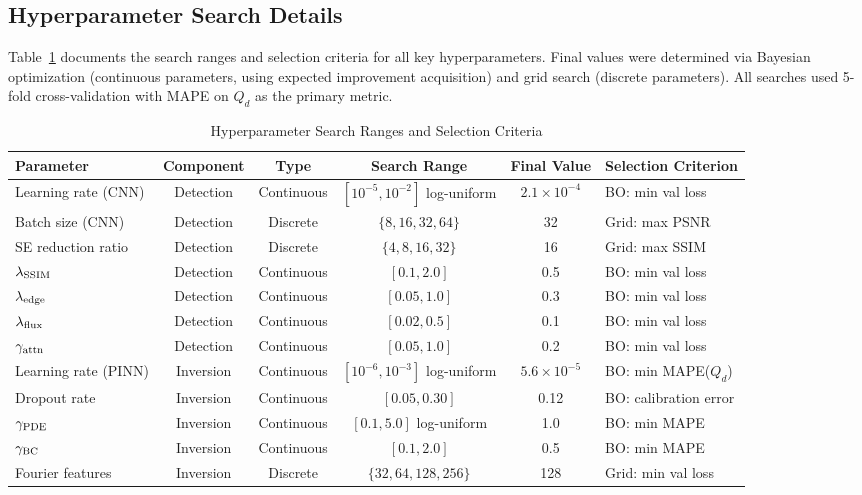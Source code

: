 \documentclass[usenatbib]{mnras}
\begin{document}
\subsection{Hyperparameter Search Details}\label{app:hyper_search}

Table~\ref{tab:hyper_search} documents the search ranges and selection criteria for all key hyperparameters. Final values were determined via Bayesian optimization (continuous parameters, using expected improvement acquisition) and grid search (discrete parameters). All searches used 5-fold cross-validation with MAPE on $Q_d$ as the primary metric.

\begin{table}
\centering
\caption{Hyperparameter Search Ranges and Selection Criteria}\label{tab:hyper_search}
\begin{tabular}{lccccl}
\toprule
Parameter & Component & Type & Search Range & Final Value & Selection Criterion \\
\midrule
Learning rate (CNN) & Detection & Continuous & $[10^{-5}, 10^{-2}]$ log-uniform & $2.1 \times 10^{-4}$ & BO: min val loss \\
Batch size (CNN) & Detection & Discrete & $\{8, 16, 32, 64\}$ & 32 & Grid: max PSNR \\
SE reduction ratio & Detection & Discrete & $\{4, 8, 16, 32\}$ & 16 & Grid: max SSIM \\
$\lambda_{\rm SSIM}$ & Detection & Continuous & $[0.1, 2.0]$ & 0.5 & BO: min val loss \\
$\lambda_{\rm edge}$ & Detection & Continuous & $[0.05, 1.0]$ & 0.3 & BO: min val loss \\
$\lambda_{\rm flux}$ & Detection & Continuous & $[0.02, 0.5]$ & 0.1 & BO: min val loss \\
$\gamma_{\rm attn}$ & Detection & Continuous & $[0.05, 1.0]$ & 0.2 & BO: min val loss \\
\midrule
Learning rate (PINN) & Inversion & Continuous & $[10^{-6}, 10^{-3}]$ log-uniform & $5.6 \times 10^{-5}$ & BO: min MAPE($Q_d$) \\
Dropout rate & Inversion & Continuous & $[0.05, 0.30]$ & 0.12 & BO: calibration error \\
$\gamma_{\rm PDE}$ & Inversion & Continuous & $[0.1, 5.0]$ log-uniform & 1.0 & BO: min MAPE \\
$\gamma_{\rm BC}$ & Inversion & Continuous & $[0.1, 2.0]$ & 0.5 & BO: min MAPE \\
Fourier features & Inversion & Discrete & $\{32, 64, 128, 256\}$ & 128 & Grid: min val loss \\

\end{tabular}
\end{table}
\end{document}
